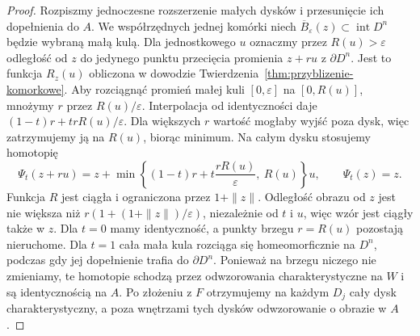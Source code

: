 \begin{proof}
Rozpiszmy jednoczesne rozszerzenie małych dysków i przesunięcie
ich dopełnienia do $A$. We współrzędnych jednej komórki niech
$\overline B_\varepsilon(z)\subset\operatorname{int}D^n$ będzie
wybraną małą kulą. Dla jednostkowego $u$ oznaczmy przez $R(u)>\varepsilon$
odległość od $z$ do jedynego punktu przecięcia promienia $z+ru$
z $\partial D^n$. Jest to funkcja $R_z(u)$ obliczona
w dowodzie Twierdzenia~\ref{thm:przyblizenie-komorkowe}.
Aby rozciągnąć promień małej kuli $[0,\varepsilon]$
na $[0,R(u)]$, mnożymy $r$ przez $R(u)/\varepsilon$.
Interpolacja od identyczności daje
$(1-t)r+trR(u)/\varepsilon$. Dla większych $r$
wartość mogłaby wyjść poza dysk, więc zatrzymujemy ją
na $R(u)$, biorąc minimum. Na całym dysku stosujemy homotopię
\[
 \Psi_t(z+ru)=z+
 \min\!\left\{(1-t)r+t\frac{rR(u)}{\varepsilon},\ R(u)\right\}u,
 \qquad \Psi_t(z)=z.
\]
Funkcja $R$ jest ciągła i ograniczona przez $1+\|z\|$.
Odległość obrazu od $z$ jest nie większa niż
$r(1+(1+\|z\|)/\varepsilon)$, niezależnie od $t$ i $u$,
więc wzór jest ciągły także w $z$. Dla $t=0$ mamy identyczność, a punkty brzegu
$r=R(u)$ pozostają nieruchome. Dla $t=1$ cała mała kula
rozciąga się homeomorficznie na $D^n$, podczas gdy jej dopełnienie
trafia do $\partial D^n$. Ponieważ na brzegu niczego nie zmieniamy,
te homotopie schodzą przez odwzorowania charakterystyczne na $W$
i są identycznością na $A$. Po złożeniu z $F$ otrzymujemy
na każdym $D_j$ cały dysk charakterystyczny, a poza wnętrzami
tych dysków odwzorowanie o obrazie w $A$.


\end{proof}

